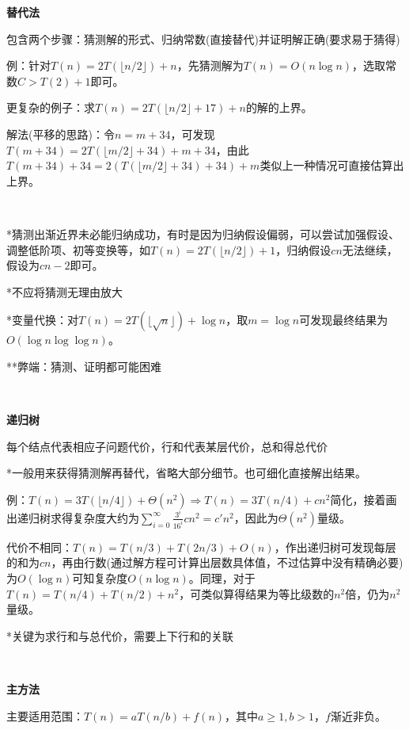 \documentclass[a4paper,UTF8,fontset=windows]{ctexart}
\begin{document}
\textbf{替代法}

包含两个步骤：猜测解的形式、归纳常数(直接替代)并证明解正确(要求易于猜得)

例：针对$T(n)=2T(\lfloor n/2\rfloor)+n$，先猜测解为$T(n)=O(n\log n)$，选取常数$C>T(2)+1$即可。

更复杂的例子：求$T(n)=2T(\lfloor n/2\rfloor + 17)+n$的解的上界。

解法(平移的思路)：令$n=m+34$，可发现$T(m+34)=2T(\lfloor m/2\rfloor+34)+m+34$，由此$T(m+34)+34=2(T(\lfloor m/2\rfloor+34)+34)+m$类似上一种情况可直接估算出上界。

\

*\hspace{0em}猜测出渐近界未必能归纳成功，有时是因为归纳假设偏弱，可以尝试加强假设、调整低阶项、初等变换等，如$T(n)=2T(\lfloor n/2\rfloor)+1$，归纳假设$cn$无法继续，假设为$cn-2$即可。

*\hspace{0em}不应将猜测无理由放大

*\hspace{0em}变量代换：对$T(n)=2T(\lfloor\sqrt{n}\rfloor)+\log n$，取$m=\log n$可发现最终结果为$O(\log n\log\log n)$。

**\hspace{0em}弊端：猜测、证明都可能困难

\

\hspace{0em}\textbf{递归树}

每个结点代表相应子问题代价，行和代表某层代价，总和得总代价

*\hspace{0em}一般用来获得猜测解再替代，省略大部分细节。也可细化直接解出结果。

例：$T(n)=3T(\lfloor n/4\rfloor)+\Theta(n^2)\Longrightarrow T(n)=3T(n/4)+cn^2$简化，接着画出递归树求得复杂度大约为$\displaystyle\sum_{i=0}^\infty \frac{3^i}{16^i}cn^2=c'n^2$，因此为$\Theta(n^2)$量级。

代价不相同：$T(n)=T(n/3)+T(2n/3)+O(n)$，作出递归树可发现每层的和为$cn$，再由行数(通过解方程可计算出层数具体值，不过估算中没有精确必要)为$O(\log n)$可知复杂度$O(n\log n)$。同理，对于$T(n)=T(n/4)+T(n/2)+n^2$，可类似算得结果为等比级数的$n^2$倍，仍为$n^2$量级。

*\hspace{0em}关键为求行和与总代价，需要上下行和的关联

\

\textbf{主方法}

主要适用范围：$T(n)=aT(n/b)+f(n)$，其中$a\ge1,b>1$，$f$渐近非负。
\end{document}
